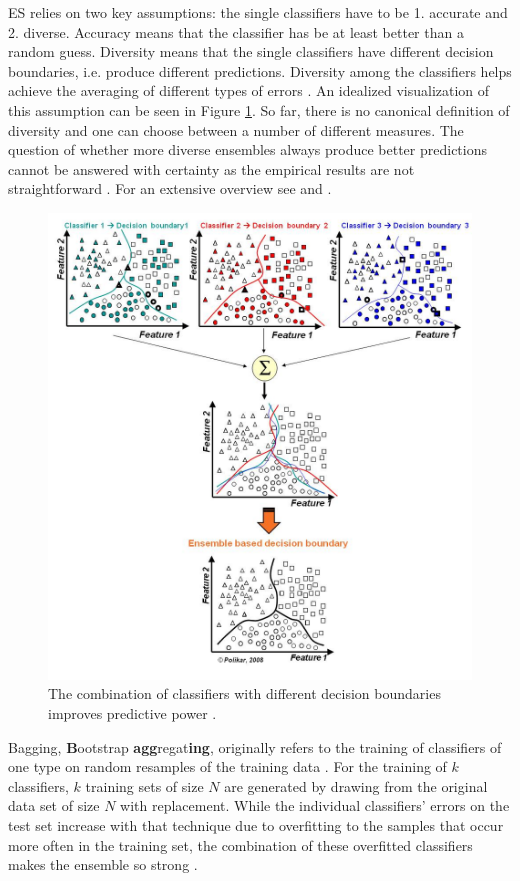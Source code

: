 ES relies on two key assumptions: the single classifiers have to be 1. accurate and 2. diverse. Accuracy means that the classifier has be at least better than a random guess. Diversity means that the single classifiers have different decision boundaries, i.e. produce different predictions. Diversity among the classifiers helps achieve the averaging of different types of errors \citep{brown2005diversity}. An idealized visualization of this assumption can be seen in Figure \ref{fig:diversity}. So far, there is no canonical definition of diversity and one can choose between a number of different measures. The question of whether more diverse ensembles always produce better predictions cannot be answered with certainty as the empirical results are not straightforward \cite[p. 203]{Kuncheva2003}. For an extensive overview see \cite{Kuncheva2003} and \cite{kuncheva2005using}.
\begin{figure}
	\centering
\includegraphics[scale=0.35]{Combining_classifiers2}
\caption{The combination of classifiers with different decision boundaries improves predictive power \citep{polikarphoto}.}
\label{fig:diversity}
\end{figure}

Bagging, \textbf{B}ootstrap \textbf{agg}regat\textbf{ing}, originally refers to the training of classifiers of one type on random resamples of the training data \citep{Breiman1996}. For the training of $k$ classifiers, $k$ training sets of size $N$ are generated by drawing from the original data set of size $N$ with replacement. While the individual classifiers' errors on the test set increase with that technique due to overfitting to the samples that occur more often in the training set, the combination of these overfitted classifiers makes the ensemble so strong \cite{krogh1996learning}.

